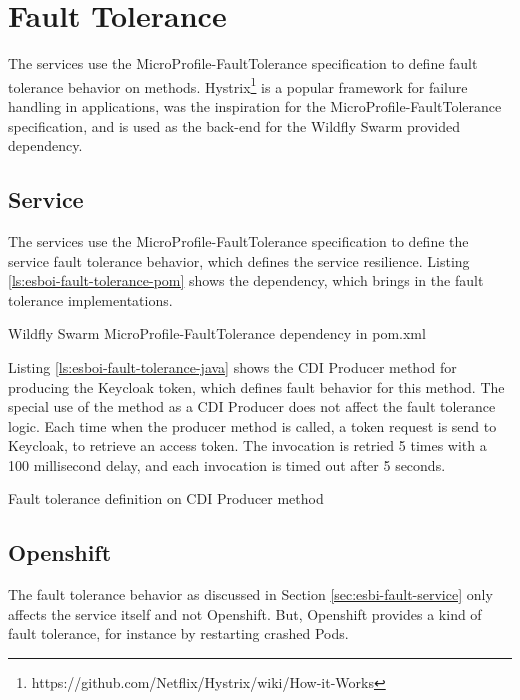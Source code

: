 \section{Fault Tolerance}
\label{sec:esbi-fault}
The services use the MicroProfile-FaultTolerance specification to define fault tolerance behavior on methods. Hystrix\footnote{https://github.com/Netflix/Hystrix/wiki/How-it-Works} is a popular framework for failure handling in applications, was the inspiration for the MicroProfile-FaultTolerance specification, and is used as the back-end for the Wildfly Swarm provided dependency.

\subsection{Service}
\label{sec:esbi-fault-service}
The services use the MicroProfile-FaultTolerance specification to define the service fault tolerance behavior, which defines the service resilience. Listing \vref{ls:esboi-fault-tolerance-pom} shows the dependency, which brings in the fault tolerance implementations.

\begin{listing}[h]
	\caption{Wildfly Swarm MicroProfile-FaultTolerance dependency in pom.xml}
	\label{ls:esboi-fault-tolerance-pom}
\end{listing}

Listing \vref{ls:esboi-fault-tolerance-java} shows the CDI Producer method for producing the Keycloak token, which defines fault behavior for this method. The special use of the method as a CDI Producer does not affect the fault tolerance logic. Each time when the producer method is called, a token request is send to Keycloak, to retrieve an access token. The invocation is retried 5 times with a 100 millisecond delay, and each invocation is timed out after 5 seconds.

\begin{listing}[h]
	\caption{Fault tolerance definition on CDI Producer method}
	\label{ls:esboi-fault-tolerance-java}
\end{listing} 

\subsection{Openshift}
\label{sec:esbi-fault-openshift}
The fault tolerance behavior as discussed in Section \vref{sec:esbi-fault-service} only affects the service itself and not Openshift. But, Openshift provides a kind of fault tolerance, for instance by restarting crashed Pods.
\newpage 

